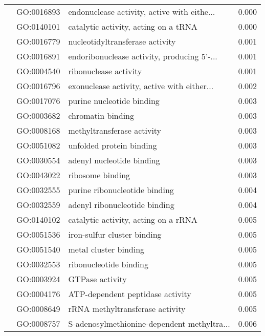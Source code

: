 \begin{longtable}{lllr}
   & GO:0016893 &  endonuclease activity, active with eithe... &         0.000 \\
   & GO:0140101 &         catalytic activity, acting on a tRNA &         0.000 \\
   & GO:0016779 &              nucleotidyltransferase activity &         0.001 \\
   & GO:0016891 &  endoribonuclease activity, producing 5'-... &         0.001 \\
   & GO:0004540 &                        ribonuclease activity &         0.001 \\
   & GO:0016796 &  exonuclease activity, active with either... &         0.002 \\
   & GO:0017076 &                    purine nucleotide binding &         0.003 \\
   & GO:0003682 &                            chromatin binding &         0.003 \\
   & GO:0008168 &                   methyltransferase activity &         0.003 \\
   & GO:0051082 &                     unfolded protein binding &         0.003 \\
   & GO:0030554 &                    adenyl nucleotide binding &         0.003 \\
   & GO:0043022 &                             ribosome binding &         0.003 \\
   & GO:0032555 &                purine ribonucleotide binding &         0.004 \\
   & GO:0032559 &                adenyl ribonucleotide binding &         0.004 \\
   & GO:0140102 &         catalytic activity, acting on a rRNA &         0.005 \\
   & GO:0051536 &                  iron-sulfur cluster binding &         0.005 \\
   & GO:0051540 &                        metal cluster binding &         0.005 \\
   & GO:0032553 &                       ribonucleotide binding &         0.005 \\
   & GO:0003924 &                              GTPase activity &         0.005 \\
   & GO:0004176 &             ATP-dependent peptidase activity &         0.005 \\
   & GO:0008649 &              rRNA methyltransferase activity &         0.005 \\
   & GO:0008757 &  S-adenosylmethionine-dependent methyltra... &         0.006 \\

\end{longtable}
